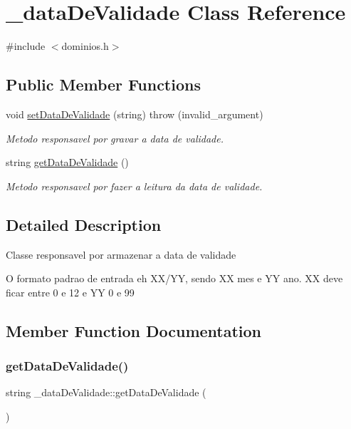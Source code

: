 \hypertarget{class__data_de_validade}{}\section{\+\_\+data\+De\+Validade Class Reference}
\label{class__data_de_validade}


{\ttfamily \#include $<$dominios.\+h$>$}

\subsection*{Public Member Functions}
\begin{DoxyCompactItemize}
\item 
void \mbox{\hyperlink{class__data_de_validade_aff3df56774e75db38d1706e2d7af6b19}{set\+Data\+De\+Validade}} (string)  throw (invalid\+\_\+argument)
\begin{DoxyCompactList}\small\item\em Metodo responsavel por gravar a data de validade. \end{DoxyCompactList}\item 
string \mbox{\hyperlink{class__data_de_validade_aa3d40f24d04feaa8a1d814c0565802be}{get\+Data\+De\+Validade}} ()
\begin{DoxyCompactList}\small\item\em Metodo responsavel por fazer a leitura da data de validade. \end{DoxyCompactList}\end{DoxyCompactItemize}


\subsection{Detailed Description}
Classe responsavel por armazenar a data de validade

O formato padrao de entrada eh X\+X/\+YY, sendo XX mes e YY ano. XX deve ficar entre 0 e 12 e YY 0 e 99 

\subsection{Member Function Documentation}
\mbox{\label{class__data_de_validade_aa3d40f24d04feaa8a1d814c0565802be}} 
\subsubsection{\texorpdfstring{getDataDeValidade()}{getDataDeValidade()}}
{\footnotesize\ttfamily string \+\_\+data\+De\+Validade\+::get\+Data\+De\+Validade (\begin{DoxyParamCaption}{ }\end{DoxyParamCaption})\hspace{0.3cm}{\ttfamily [inline]}}



